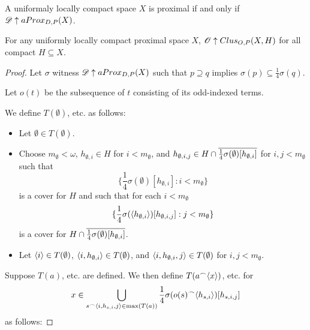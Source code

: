 \begin{corollary}
  A uniformaly locally compact space $X$ is proximal if and only if $\mathscr{D} \uparrow aProx_{D,P}(X)$.
\end{corollary}

\begin{theorem}
  For any uniformly locally compact proximal space $X$, $\mathscr{O}\uparrow Clus_{O,P}(X,H)$ for all compact $H\subseteq X$.
\end{theorem}

\begin{proof}
  Let $\sigma$ witness $\mathscr{D} \uparrow aProx_{D,P}(X)$ such that $p\supseteq q$ implies $\sigma(p)\subseteq \frac{1}{4}\sigma(q)$.

  Let $o(t)$ be the subsequence of $t$ consisting of its odd-indexed terms.

  We define $T(\emptyset)$, etc. as follows:

  \begin{itemize}
    \item Let $\emptyset\in T(\emptyset)$.
    \item Choose $m_\emptyset<\omega$, $h_{\emptyset,i}\in H$ for $i<m_\emptyset$, and $h_{\emptyset,i,j}\in H\cap\overline{\frac{1}{4}\sigma(\emptyset)[h_{\emptyset,i}]}$ for $i,j<m_\emptyset$ such that
      \[
        \{\frac{1}{4}\sigma(\emptyset)[h_{\emptyset,i}]:i<m_\emptyset\}
      \]
    is a cover for $H$ and such that for each $i<m_\emptyset$
      \[
        \{\frac{1}{4}\sigma(\langle h_{\emptyset,i}\rangle)[h_{\emptyset,i,j}]:j<m_\emptyset\}
      \]
    is a cover for $H\cap\overline{\frac{1}{4}\sigma(\emptyset)[h_{\emptyset,i}]}$.
    \item Let $\langle i\rangle\in T(\emptyset)$, $\langle i,h_{\emptyset,i}\rangle\in T(\emptyset)$, and $\langle i,h_{\emptyset,i},j\rangle\in T(\emptyset)$ for $i,j<m_\emptyset$.
  \end{itemize}

  Suppose $T(a)$, etc. are defined. We then define $T(a^\frown\langle x\rangle)$, etc. for
    \[
      x\in \bigcup_{s^\frown\langle i,h_{s,i},j\rangle\in\max(T(a))} \frac{1}{4}\sigma(o(s)^\frown\langle h_{s,i}\rangle)[h_{s,i,j}]
    \]
  as follows:


\end{proof}
